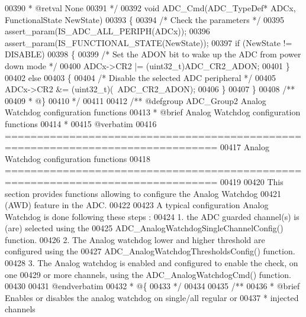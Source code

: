 \begin{DoxyCode}
00390 \textcolor{comment}{  * @retval None}
00391 \textcolor{comment}{  */}
00392 \textcolor{keywordtype}{void} ADC_Cmd(ADC\_TypeDef* ADCx, FunctionalState NewState)
00393 \{
00394   \textcolor{comment}{/* Check the parameters */}
00395   assert_param(IS\_ADC\_ALL\_PERIPH(ADCx));
00396   assert_param(IS\_FUNCTIONAL\_STATE(NewState));
00397   \textcolor{keywordflow}{if} (NewState != DISABLE)
00398   \{
00399     \textcolor{comment}{/* Set the ADON bit to wake up the ADC from power down mode */}
00400     ADCx->CR2 |= (uint32\_t)ADC_CR2_ADON;
00401   \}
00402   \textcolor{keywordflow}{else}
00403   \{
00404     \textcolor{comment}{/* Disable the selected ADC peripheral */}
00405     ADCx->CR2 &= (uint32\_t)(~ADC_CR2_ADON);
00406   \}
00407 \}
00408 \textcolor{comment}{/**}
00409 \textcolor{comment}{  * @\}}
00410 \textcolor{comment}{  */}
00411 
00412 \textcolor{comment}{/** @defgroup ADC\_Group2 Analog Watchdog configuration functions}
00413 \textcolor{comment}{ *  @brief    Analog Watchdog configuration functions }
00414 \textcolor{comment}{ *}
00415 \textcolor{comment}{@verbatim   }
00416 \textcolor{comment}{ ===============================================================================}
00417 \textcolor{comment}{                    Analog Watchdog configuration functions}
00418 \textcolor{comment}{ ===============================================================================  }
00419 \textcolor{comment}{}
00420 \textcolor{comment}{  This section provides functions allowing to configure the Analog Watchdog}
00421 \textcolor{comment}{  (AWD) feature in the ADC.}
00422 \textcolor{comment}{  }
00423 \textcolor{comment}{  A typical configuration Analog Watchdog is done following these steps :}
00424 \textcolor{comment}{   1. the ADC guarded channel(s) is (are) selected using the }
00425 \textcolor{comment}{      ADC\_AnalogWatchdogSingleChannelConfig() function.}
00426 \textcolor{comment}{   2. The Analog watchdog lower and higher threshold are configured using the  }
00427 \textcolor{comment}{     ADC\_AnalogWatchdogThresholdsConfig() function.}
00428 \textcolor{comment}{   3. The Analog watchdog is enabled and configured to enable the check, on one}
00429 \textcolor{comment}{      or more channels, using the  ADC\_AnalogWatchdogCmd() function.}
00430 \textcolor{comment}{}
00431 \textcolor{comment}{@endverbatim}
00432 \textcolor{comment}{  * @\{}
00433 \textcolor{comment}{  */}
00434 
00435 \textcolor{comment}{/**}
00436 \textcolor{comment}{  * @brief  Enables or disables the analog watchdog on single/all regular or }
00437 \textcolor{comment}{  *         injected channels}

\end{DoxyCode}
